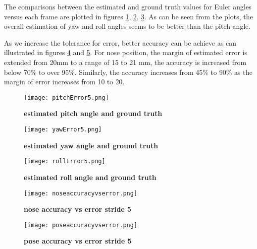 The comparisons between the estimated and ground truth values for Euler angles versus each frame are plotted in figures \ref{fig:pitch}, \ref{fig:yaw}, \ref{fig:roll}. As can be seen from the plots, the overall estimation of yaw and roll angles seems to be better than the pitch angle.

As we increase the tolerance for error, better accuracy can be achieve as can illustrated in figures \ref{fig:noseavse} and \ref{fig:poseavse}. For nose position, the margin of estimated error is extended from 20mm to a range of 15 to 21 mm, the accuracy is increased from below 70\% to over 95\%. Similarly, the accuracy increases from 45\% to 90\% as the margin of error increases from 10 to 20.

\begin{figure}
	\centering
	\texttt{[image: pitchError5.png]}
	\caption[pitch Error]{\label{fig:pitch}}  \textbf{estimated pitch angle and ground truth } 
\end{figure}

\begin{figure}
	\centering
	\texttt{[image: yawError5.png]}
	\caption[yaw Error]{\label{fig:yaw}}  \textbf{estimated yaw angle and ground truth } 
\end{figure}

\begin{figure}
	\centering
	\texttt{[image: rollError5.png]}
	\caption[roll Error]{\label{fig:roll}}  \textbf{estimated roll angle and ground truth } 
\end{figure}

 

\begin{figure}
	\centering
	\texttt{[image: noseaccuracyvserror.png]}
	\caption[Nose accuracy vs error]{\label{fig:noseavse}}  \textbf{nose accuracy vs error stride 5 } 
\end{figure}

\begin{figure}
	\centering
	\texttt{[image: poseaccuracyvserror.png]}
	\caption[Pose accuracy vs error]{\label{fig:poseavse}}  \textbf{pose accuracy vs error stride 5 } 
\end{figure}


